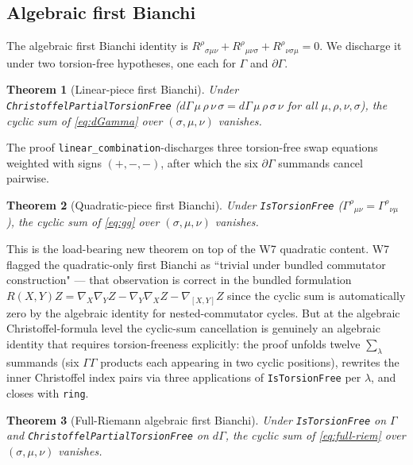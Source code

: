 \documentclass[twocolumn]{revtex4-2}
\newtheorem{theorem}{Theorem}
\newcommand{\Christoffel}{\Gamma}
\newcommand{\Riem}{R}
\begin{document}
\subsection{Algebraic first Bianchi}
The algebraic first Bianchi identity is
$\Riem^{\rho}{}_{\sigma\mu\nu} + \Riem^{\rho}{}_{\mu\nu\sigma}
+ \Riem^{\rho}{}_{\nu\sigma\mu} = 0$. We discharge it under two
torsion-free hypotheses, one each for $\Christoffel$ and
$\partial\Christoffel$.

\begin{theorem}[Linear-piece first Bianchi]\label{thm:linear-bianchi}
Under \texttt{ChristoffelPartialTorsionFree}
($d\Christoffel\,\mu\,\rho\,\nu\,\sigma = d\Christoffel\,\mu\,\rho\,
\sigma\,\nu$ for all $\mu,\rho,\nu,\sigma$), the cyclic sum of
\eqref{eq:dGamma} over $(\sigma,\mu,\nu)$ vanishes.
\end{theorem}

The proof \texttt{linear\_combination}-discharges three torsion-free
swap equations weighted with signs $(+,-,-)$, after which the six
$\partial\Christoffel$ summands cancel pairwise.

\begin{theorem}[Quadratic-piece first Bianchi]\label{thm:quad-bianchi}
Under \texttt{IsTorsionFree} ($\Christoffel^{\rho}{}_{\mu\nu}
= \Christoffel^{\rho}{}_{\nu\mu}$), the cyclic sum of \eqref{eq:gg}
over $(\sigma,\mu,\nu)$ vanishes.
\end{theorem}

This is the load-bearing new theorem on top of the W7 quadratic
content. W7 flagged the quadratic-only first Bianchi as ``trivial
under bundled commutator construction" — that observation is correct
in the bundled formulation $R(X,Y)Z = \nabla_X\nabla_Y Z -
\nabla_Y\nabla_X Z - \nabla_{[X,Y]} Z$ since the cyclic sum is
automatically zero by the algebraic identity for nested-commutator
cycles. But at the algebraic Christoffel-formula level the cyclic-sum
cancellation is genuinely an algebraic identity that requires
torsion-freeness explicitly: the proof unfolds twelve
$\sum_{\lambda}$ summands (six $\Christoffel\Christoffel$ products
each appearing in two cyclic positions), rewrites the inner
Christoffel index pairs via three applications of
\texttt{IsTorsionFree} per $\lambda$, and closes with \texttt{ring}.

\begin{theorem}[Full-Riemann algebraic first Bianchi]\label{thm:full-bianchi}
Under \texttt{IsTorsionFree} on $\Christoffel$ and
\texttt{ChristoffelPartialTorsionFree} on $d\Christoffel$, the cyclic
sum of \eqref{eq:full-riem} over $(\sigma,\mu,\nu)$ vanishes.
\end{theorem}
\end{document}
